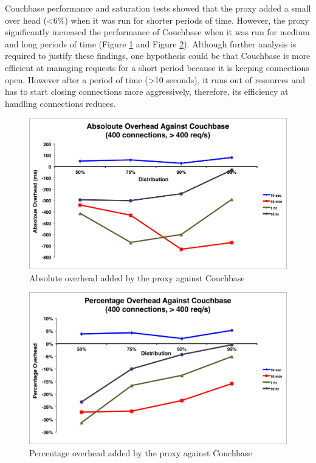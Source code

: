 \documentclass[a4paper,11pt,twoside]{report}
\begin{document}
Couchbase performance and saturation tests showed that the proxy added a small over head (<6\%) when it was run for shorter periods of time.  However, the proxy significantly increased the performance of Couchbase when it was run for medium and long periods of time (Figure \ref{absoloute-couchbase} and Figure \ref{percentage-couchbase}). Although further analysis is required to justify these findings, one hypothesis could be that Couchbase is more efficient at managing requests for a short period because it is keeping connections open. However after a period of time (>10 seconds), it runs out of resources and has to start closing connections more aggressively, therefore, its efficiency at handling connections reduces.


\begin{figure}[!ht]
  \centering
     \includegraphics[scale=0.55]{absoloute-couchbase}
  \caption{Absolute overhead added by the proxy against Couchbase}
  \label{absoloute-couchbase}
\end{figure} 

\begin{figure}[!ht]
  \centering
     \includegraphics[scale=0.55]{percentage-couchbase}
  \caption{Percentage overhead added by the proxy against Couchbase}
  \label{percentage-couchbase}
\end{figure} 
\end{document}
